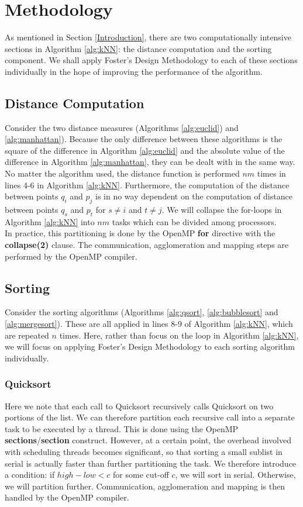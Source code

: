 \documentclass[10pt]{article}
\begin{document}
\section{Methodology}\label{Methodology}
As mentioned in Section \ref{Introduction}, there are two computationally intensive sections in Algorithm \ref{alg:kNN}: the distance computation and the sorting component. We shall apply Foster's Design Methodology to each of these sections individually in the hope of improving the performance of the algorithm.
\subsection{Distance Computation}
Consider the two distance measures (Algorithms \ref{alg:euclid}) and \ref{alg:manhattan}). Because the only difference between these algorithms is the square of the difference in Algorithm \ref{alg:euclid} and the absolute value of the difference in Algorithm \ref{alg:manhattan}, they can be dealt with in the same way. No matter the algorithm used, the distance function is performed $nm$ times in lines 4-6 in Algorithm \ref{alg:kNN}. Furthermore, the computation of the distance between points $q_{i}$ and $p_{j}$ is in no way dependent on the computation of distance between points $q_{s}$ and $p_{t}$ for $s\neq i$ and $t\neq j$. We will collapse the for-loops in Algorithm \ref{alg:kNN} into $nm$ tasks which can be divided among processors. 
\\
In practice, this partitioning is done by the OpenMP \textbf{for} directive with the \textbf{collapse(2)} clause. The communication, agglomeration and mapping steps are performed by the OpenMP compiler.
\subsection{Sorting}
Consider the sorting algorithms (Algorithms \ref{alg:qsort}, \ref{alg:bubblesort} and \ref{alg:mergesort}). These are all applied in lines 8-9 of Algorithm \ref{alg:kNN}, which are repeated $n$ times. Here, rather than focus on the loop in Algorithm \ref{alg:kNN}, we will focus on applying Foster's Design Methodology to each sorting algorithm individually.
\subsubsection{Quicksort}
Here we note that each call to Quicksort recursively calls Quicksort on two portions of the list. We can therefore partition each recursive call into a separate task to be executed by a thread. This is done using the OpenMP \textbf{sections}/\textbf{section} construct. However, at a certain point, the overhead involved with scheduling threads becomes significant, so that sorting a small sublist in serial is actually faster than further partitioning the task. We therefore introduce a condition: if $high-low<c$ for some cut-off $c$, we will sort in serial. Otherwise, we will partition further. Communication, agglomeration and mapping is then handled by the OpenMP compiler.
\end{document}
